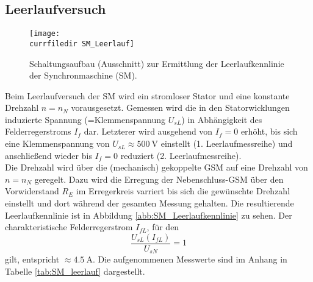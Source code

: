 \subsection{Leerlaufversuch}
\label{subsec:leerlauf}
\begin{figure}
    \centering
    \texttt{[image: \\currfiledir SM\_Leerlauf]}
    \caption{Schaltungsaufbau (Ausschnitt) zur Ermittlung der Leerlaufkennlinie der Synchronmaschine (SM).}
    \label{fig:SM_Leerlauf}
\end{figure}
Beim Leerlaufversuch der SM wird ein stromloser Stator und eine konstante Drehzahl $n=n_N$ vorausgesetzt. Gemessen wird die in den Statorwicklungen induzierte Spannung (=Klemmenspannung $U_{sL}$) in Abhängigkeit des Felderregerstroms $I_f$ dar. Letzterer wird ausgehend von $I_f=0$ erhöht, bis sich eine Klemmenspannung von $U_{sL}\approx\SI{500}{\volt}$ einstellt (1. Leerlaufmessreihe) und anschließend wieder bis $I_f=0$ reduziert (2. Leerlaufmessreihe).\\
Die Drehzahl wird über die (mechanisch) gekoppelte GSM auf eine Drehzahl von $n=n_N$ geregelt. Dazu wird die Erregung der Nebenschluss-GSM über den Vorwiderstand $R_E$ im Erregerkreis varriert bis sich die gewünschte Drehzahl einstellt und dort während der gesamten Messung gehalten. Die resultierende Leerlaufkennlinie ist in Abbildung \ref{abb:SM_Leerlaufkennlinie} zu sehen. Der charakteristische Felderregerstrom $I_{fL}$, für den
\begin{equation*}
    \frac{U_{sL}(I_{fL})}{U_{sN}} = 1 
\end{equation*}
gilt, entspricht $\approx\SI{4.5}{\ampere}$. Die aufgenommenen Messwerte sind im Anhang in Tabelle \ref{tab:SM_leerlauf} dargestellt.

